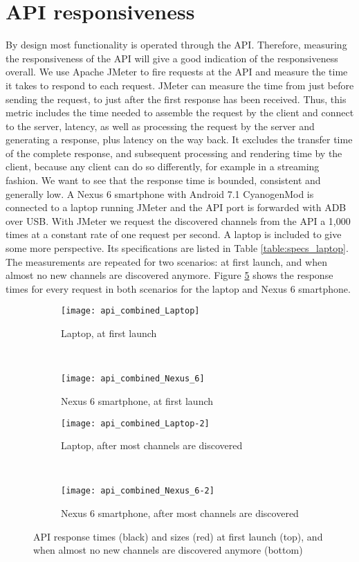\section{API responsiveness}\label{sec:api_responsiveness}
By design most functionality is operated through the API.
Therefore, measuring the responsiveness of the API will give a good indication of the responsiveness overall.
We use Apache JMeter to fire requests at the API and measure the time it takes to respond to each request.
JMeter can measure the time from just before sending the request, to just after the first response has been received. \cite{jmeter_glossary}
Thus, this metric includes the time needed to assemble the request by the client and connect to the server, latency, as well as processing the request by the server and generating a response, plus latency on the way back.
It excludes the transfer time of the complete response, and subsequent processing and rendering time by the client, because any client can do so differently, for example in a streaming fashion.
We want to see that the response time is bounded, consistent and generally low.
A Nexus 6 smartphone with Android 7.1 CyanogenMod is connected to a laptop running JMeter and the API port is forwarded with ADB over USB.
With JMeter we request the discovered channels from the API a 1,000 times at a constant rate of one request per second.
A laptop is included to give some more perspective.
Its specifications are listed in Table \ref{table:specs_laptop}.
The measurements are repeated for two scenarios: at first launch, and when almost no new channels are discovered anymore.
Figure \ref{fig:api_combined} shows the response times for every request in both scenarios for the laptop and Nexus 6 smartphone.
\begin{figure}[H]
	\centering
	\begin{subfigure}{.49\textwidth}
		\texttt{[image: api\_combined\_Laptop]}
		\caption{Laptop, at first launch}
		\label{fig:api_Laptop}
	\end{subfigure}
	~
	\begin{subfigure}{.49\textwidth}
		\texttt{[image: api\_combined\_Nexus\_6]}
		\caption{Nexus 6 smartphone, at first launch}
		\label{fig:api_Nexus_6}
	\end{subfigure}
	
	\begin{subfigure}{.49\textwidth}
		\texttt{[image: api\_combined\_Laptop-2]}
		\caption{Laptop, after most channels are discovered}
		\label{fig:api_Laptop-2}
	\end{subfigure}
	~
	\begin{subfigure}{.49\textwidth}
		\texttt{[image: api\_combined\_Nexus\_6-2]}
		\caption{Nexus 6 smartphone, after most channels are discovered}
		\label{fig:api_Nexus_6-2}
	\end{subfigure}
\caption{API response times (black) and sizes (red) at first launch (top), and when almost no new channels are discovered anymore (bottom)}
\label{fig:api_combined}
\end{figure}

